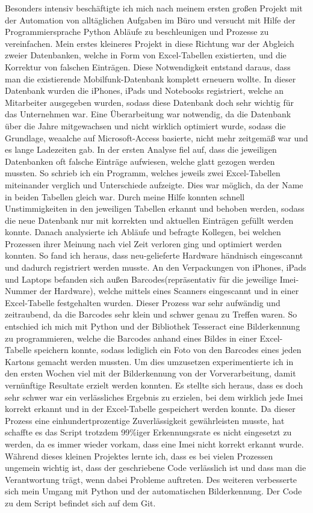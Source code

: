 Besonders intensiv beschäftigte ich mich nach meinem ersten großen Projekt mit der Automation von alltäglichen Aufgaben im Büro und versucht mit Hilfe der Programmiersprache Python Abläufe zu beschleunigen und Prozesse zu vereinfachen. 
Mein erstes kleineres Projekt in diese Richtung war der Abgleich zweier Datenbanken, welche in Form von Excel-Tabellen existierten, und die Korrektur von falschen Einträgen. Diese Notwendigkeit entstand daraus, dass man die existierende Mobilfunk-Datenbank komplett erneuern wollte. In dieser Datenbank wurden die iPhones, iPads und Notebooks registriert, welche an Mitarbeiter ausgegeben wurden, sodass diese Datenbank doch sehr wichtig für das Unternehmen war. Eine Überarbeitung war notwendig, da die Datenbank über die Jahre mitgewachsen und nicht wirklich optimiert wurde, sodass die Grundlage, weaalche auf Microsoft-Access basierte, nicht mehr zeitgemäß war und es lange Ladezeiten gab. In der ersten Analyse fiel auf, dass die jeweiligen Datenbanken oft falsche Einträge aufwiesen, welche glatt gezogen werden mussten. So schrieb ich ein Programm, welches jeweils zwei Excel-Tabellen miteinander verglich und Unterschiede aufzeigte. Dies war möglich, da der Name in beiden Tabellen gleich war. Durch meine Hilfe konnten schnell Unstimmigkeiten in den jeweiligen Tabellen erkannt und behoben werden, sodass die neue Datenbank nur mit korrekten und aktuellen Einträgen gefüllt werden konnte. Danach analysierte ich Abläufe und befragte Kollegen, bei welchen Prozessen ihrer Meinung nach viel Zeit verloren ging und optimiert werden konnten. So fand ich heraus, dass neu-gelieferte Hardware händnisch eingescannt und dadurch registriert werden musste. An den Verpackungen von iPhones, iPads und Laptops befanden sich außen Barcodes(repräsentativ für die jeweilige Imei-Nummer der Hardware), welche mittels eines Scanners eingescannt und in einer Excel-Tabelle festgehalten wurden. Dieser Prozess war sehr aufwändig und zeitraubend, da die Barcodes sehr klein und schwer genau zu Treffen waren. So entschied ich mich mit Python und der Bibliothek Tesseract eine Bilderkennung zu programmieren, welche die Barcodes anhand eines Bildes in einer Excel-Tabelle speichern konnte, sodass lediglich ein Foto von den Barcodes eines jeden Kartons gemacht werden mussten. Um dies umzusetzen experimentierte ich in den ersten Wochen viel mit der Bilderkennung von der Vorverarbeitung, damit vernünftige Resultate erzielt werden konnten. Es stellte sich heraus, dass es doch sehr schwer war ein verlässliches Ergebnis zu erzielen, bei dem wirklich jede Imei korrekt erkannt und in der Excel-Tabelle gespeichert werden konnte. Da dieser Prozess eine einhundertprozentige Zuverlässigkeit gewährleisten musste, hat schaffte es das Script trotzdem 99\%iger Erkennungsrate es nicht eingesetzt zu werden, da es immer wieder vorkam, dass eine Imei nicht korrekt erkannt wurde. Während dieses kleinen Projektes lernte ich, dass es bei vielen Prozessen ungemein wichtig ist, dass der geschriebene Code verlässlich ist und dass man die Verantwortung trägt, wenn dabei Probleme auftreten. Des weiteren verbesserte sich mein Umgang mit Python und der automatischen Bilderkennung. Der Code zu dem Script befindet sich auf dem Git.

